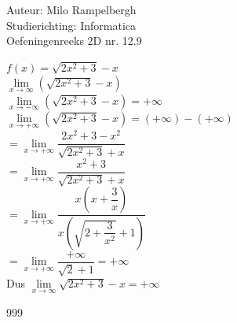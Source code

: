 \documentclass[a4paper]{article}
\newcommand{\fx}{\sqrt{2x^2+3}-x}
\newcommand{\llim}[1]{ \lim\limits_{x \rightarrow #1} }
\begin{document}
\noindent \large Auteur: Milo Rampelbergh \\
\noindent \large Studierichting: Informatica\\
\noindent \large Oefeningenreeks 2D nr. 12.9\\

\medskip

\normalsize


$ f(x) = \fx $ \\

$ \llim{\infty} (\fx) $ \\

$ \llim{-\infty} (\fx) = +\infty $ \\

$ \llim{+\infty} (\fx) = (+\infty) - (+\infty) $ \\

$ = \llim{+\infty} \dfrac{2x^2+3-x^2}{ \sqrt{2x^2+3}+x } $ \\

$ = \llim{+\infty} \dfrac{ x^2+3 }{ \sqrt{2x^2+3}+x } $ \\

$ = \llim{+\infty} \dfrac{ x\left(x+\dfrac{3}{x}\right) }{     x\left(\sqrt{ 2+\dfrac{3}{x^2} }+1\right)   } $ \\

$ = \llim{+\infty} \dfrac{+\infty}{\sqrt{2}+1} = +\infty $ \\

Dus $ \llim{\infty} \fx = +\infty $ \\


\begin{thebibliography}{999}
\end{thebibliography}
\end{document}
